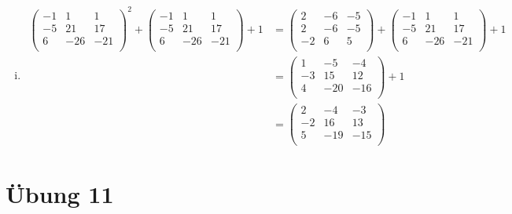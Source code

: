 \documentclass{article}
\begin{document}
\begin{enumerate}[(i)]
\item
  \begin{align*}
    \left(
    \begin{array}{ccc}
      -1 & 1   & 1   \\
      -5 & 21  & 17  \\
      6  & -26 & -21 \\
    \end{array}
    \right)^2
    +
    \left(
    \begin{array}{ccc}
      -1 & 1   & 1   \\
      -5 & 21  & 17  \\
      6  & -26 & -21 \\
    \end{array}
    \right)
    + 1
    &=
    \left(
    \begin{array}{ccc}
      2  & -6 & -5 \\
      2  & -6 & -5 \\
      -2 & 6  & 5  \\
    \end{array}
    \right)
    +
    \left(
    \begin{array}{ccc}
      -1 & 1   & 1   \\
      -5 & 21  & 17  \\
      6  & -26 & -21 \\
    \end{array}
    \right)
    + 1 \\
    &=
    \left(
    \begin{array}{ccc}
      1  & -5  & -4  \\
      -3 & 15  & 12  \\
      4  & -20 & -16 \\
    \end{array}
    \right)
    + 1 \\
    &=
    \left(
    \begin{array}{ccc}
      2  & -4  & -3  \\
      -2 & 16  & 13  \\
      5  & -19 & -15 \\
    \end{array}
    \right)
    \end{align*}
\end{enumerate}

\section*{Übung 11}
\end{document}
